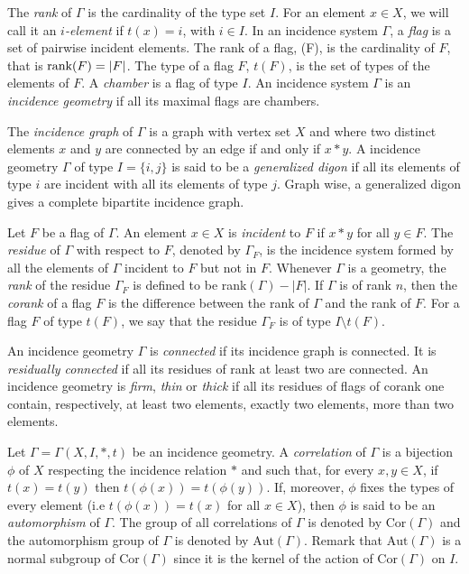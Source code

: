 \documentclass[11pt,letterpaper]{amsart}
\newcommand{\Aut}{\mathrm{Aut}}
\newcommand{\Cor}{\mathrm{Cor}}
\begin{document}
The \textit{rank} of $\Gamma$ is the cardinality of the type set $I$.
For an element $x\in X$, we will call it an \emph{$i$-element} if $t(x)=i$, with $i\in I$.
In an incidence system $\Gamma$, a \textit{flag} is a set of pairwise incident elements. The rank of a flag, (F), is the cardinality of $F$, that is $\textnormal{rank}(F)=|F|$. The type of a flag $F$, $t(F)$, is the set of types of the elements of $F$. 
A \textit{chamber} is a flag of type $I$. An incidence system $\Gamma$ is an \textit{incidence geometry} if all its maximal flags are chambers.


The \textit{incidence graph} of $\Gamma$ is a graph with vertex set $X$ and where two distinct elements $x$ and $y$ are connected by an edge if and only if $x * y$. A incidence geometry $\Gamma$ of type $I=\{i,j\}$ is said to be a \emph{generalized digon} if all its elements of type $i$ are incident with all its elements of type $j$. Graph wise, a generalized digon gives a complete bipartite incidence graph.

Let $F$ be a flag of $\Gamma$. An element $x\in X$ is {\em incident} to $F$ if $x*y$ for all $y\in F$. The \textit{residue} of $\Gamma$ with respect to $F$, denoted by $\Gamma_F$, is the incidence system formed by all the elements of $\Gamma$ incident to $F$ but not in $F$. Whenever $\Gamma$ is a geometry, the \textit{rank} of the residue $\Gamma_F$ is defined to be rank$(\Gamma) - |F|$. If $\Gamma$ is of rank $n$, then the \textit{corank} of a flag $F$ is the difference between the rank of $\Gamma$ and the rank of $F$.
For a flag $F$ of type $t(F)$, we say that the residue $\Gamma_F$ is of type $I\setminus t(F)$.

An incidence geometry $\Gamma$ is \textit{connected} if its incidence graph is connected. It is \textit{residually connected} if all its residues of rank at least two are connected.
An incidence geometry is \textit{firm}, \textit{thin} or \textit{thick} if all its residues of flags of corank one contain, respectively, at least two elements,  exactly two elements, more than two elements.

Let $\Gamma = \Gamma(X,I,*,t)$ be an incidence geometry. A {\em correlation} of $\Gamma$ is a bijection $\phi$ of $X$ respecting the incidence relation $*$ and such that, for every $x,y \in X$, if $t(x) = t(y)$ then $t(\phi(x)) = t(\phi(y))$. If, moreover, $\phi$ fixes the types of every element (i.e $t(\phi(x)) = t(x)$ for all $x \in X$), then $\phi$ is said to be an {\em automorphism} of $\Gamma$. The group of all correlations of $\Gamma$ is denoted by $\Cor(\Gamma)$ and the automorphism group of $\Gamma$ is denoted by $\Aut(\Gamma)$. Remark that $\Aut(\Gamma)$ is a normal subgroup of $\Cor(\Gamma)$ since it is the kernel of the action of $\Cor(\Gamma)$ on $I$.
\end{document}
